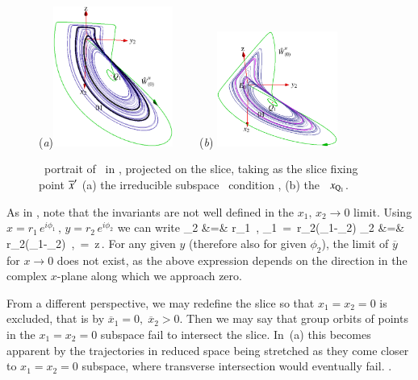 \documentclass[preprint,number,sort&compress]{elsarticle}
\begin{document}
%
\begin{figure}[ht]
\begin{center}
  (\textit{a})\includegraphics[width=0.35\textwidth,clip=true]{CLEcoord245}
 ~~~~(\textit{b})%
\includegraphics[width=0.35\textwidth,clip=true]{CLEperpReqb}
\end{center}
\caption{
\Statesp\ portrait of \cLf\ in \reducedsp, projected on the
slice, taking as the slice fixing point ${\overline{x}'}$
(a) the irreducible subspace \slice\ condition ,
(b) the \reqv\ $x_{\mathrm{Q}_{1}}$.
}
\label{fig:CLEmf}
\end{figure}


As in , note that the in\-vari\-ants
are not well defined in the $x_1,\,x_2 \to 0$ limit.
Using $x=r_1\, e^{i\phi_1}\,,\, y=r_2\, e^{i\phi_2}$ we can write
\bea
	  _2 &=& r_1 \,,\qquad
	  _1 \,=\, r_2\sin(\phi_1-\phi_2)\continue
	  _2 &=& r_2\cos(\phi_1-\phi_2) \,,\qquad	
	   \,=\, z\,.
	  \label{eq:invLaserPolar}
\eea
For any given $y$ (therefore also for given $\phi_2$), the
limit of $\overline{y}$ for $x \rightarrow 0$ does not exist,
as the above expression depends on the direction in the
complex $x$-plane along which we approach zero.

From a different perspective, we may redefine the slice so
that $x_1=x_2=0$ is excluded, that is by
$\overline{x}_1=0,\;\overline{x}_2>0$. Then we may say that
group orbits of points in the $x_1=x_2=0$ subspace fail to
intersect the slice. In \,(a) this becomes
apparent by the trajectories in reduced space being stretched
as they come closer to $x_1=x_2=0$ subspace, where transverse
intersection would eventually fail.
    .
\end{document}
